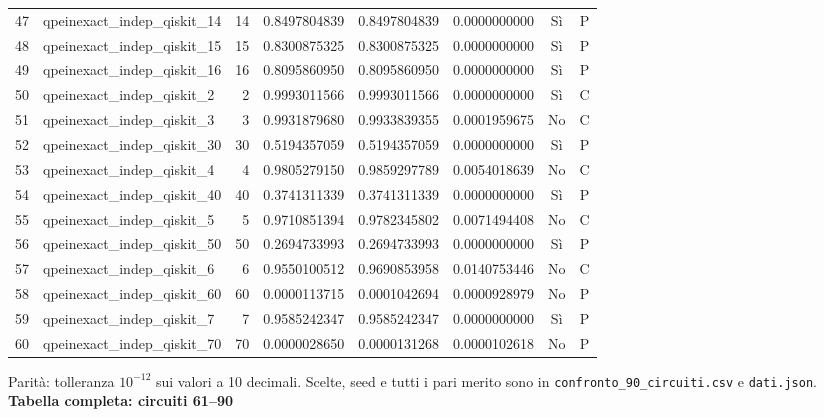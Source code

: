 \documentclass[10pt,a4paper,landscape]{article}
\newcommand{\titolo}[1]{{\Large\bfseries #1}\par\vspace{3mm}}
\begin{document}
{\begin{tabular}{rlrrrrcc}
47 & qpeinexact\_indep\_qiskit\_14 & 14 & 0.8497804839 & 0.8497804839 & 0.0000000000 & Sì & P \\
48 & qpeinexact\_indep\_qiskit\_15 & 15 & 0.8300875325 & 0.8300875325 & 0.0000000000 & Sì & P \\
49 & qpeinexact\_indep\_qiskit\_16 & 16 & 0.8095860950 & 0.8095860950 & 0.0000000000 & Sì & P \\
50 & qpeinexact\_indep\_qiskit\_2 & 2 & 0.9993011566 & 0.9993011566 & 0.0000000000 & Sì & C \\
51 & qpeinexact\_indep\_qiskit\_3 & 3 & 0.9931879680 & 0.9933839355 & 0.0001959675 & No & C \\
52 & qpeinexact\_indep\_qiskit\_30 & 30 & 0.5194357059 & 0.5194357059 & 0.0000000000 & Sì & P \\
53 & qpeinexact\_indep\_qiskit\_4 & 4 & 0.9805279150 & 0.9859297789 & 0.0054018639 & No & C \\
54 & qpeinexact\_indep\_qiskit\_40 & 40 & 0.3741311339 & 0.3741311339 & 0.0000000000 & Sì & P \\
55 & qpeinexact\_indep\_qiskit\_5 & 5 & 0.9710851394 & 0.9782345802 & 0.0071494408 & No & C \\
56 & qpeinexact\_indep\_qiskit\_50 & 50 & 0.2694733993 & 0.2694733993 & 0.0000000000 & Sì & P \\
57 & qpeinexact\_indep\_qiskit\_6 & 6 & 0.9550100512 & 0.9690853958 & 0.0140753446 & No & C \\
58 & qpeinexact\_indep\_qiskit\_60 & 60 & 0.0000113715 & 0.0001042694 & 0.0000928979 & No & P \\
59 & qpeinexact\_indep\_qiskit\_7 & 7 & 0.9585242347 & 0.9585242347 & 0.0000000000 & Sì & P \\
60 & qpeinexact\_indep\_qiskit\_70 & 70 & 0.0000028650 & 0.0000131268 & 0.0000102618 & No & P \\
\bottomrule
\end{tabular}

}\par\small Parità: tolleranza $10^{-12}$ sui valori a 10 decimali. Scelte, seed e tutti i pari merito sono in \texttt{confronto\_90\_circuiti.csv} e \texttt{dati.json}.
\newpage
\titolo{Tabella completa: circuiti 61--90}
\end{document}
